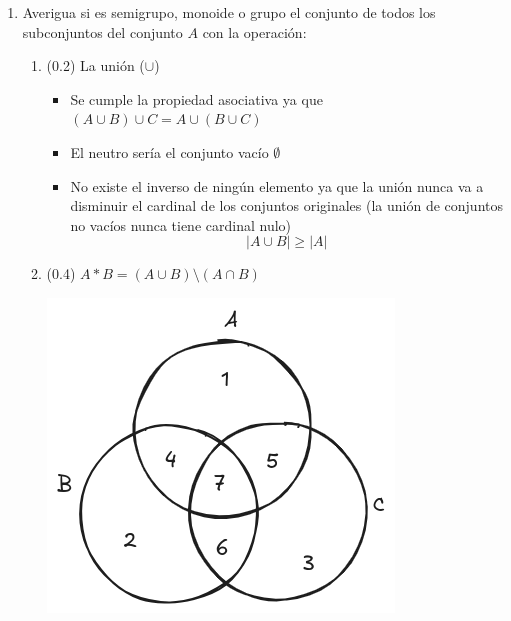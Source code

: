 \documentclass[a4paper,12pt]{article}
\begin{document}
\begin{enumerate}
    \item Averigua si es semigrupo, monoide o grupo el conjunto de todos los subconjuntos del conjunto $A$ con la operación:

    \begin{enumerate}
        \item (0.2) La unión ($\cup$)

        \begin{itemize}
            \item Se cumple la propiedad asociativa ya que $(A\cup B)\cup C = A \cup (B \cup C)$
            \item El neutro sería el conjunto vacío $\emptyset$
            \item No existe el inverso de ningún elemento ya que la unión nunca va a disminuir el cardinal de los conjuntos originales (la unión de conjuntos no vacíos nunca tiene cardinal nulo)
                $$|A\cup B| \ge |A|$$
        \end{itemize}

        \item (0.4) $A*B = (A \cup B) \setminus (A \cap B)$

        \includegraphics[scale=0.4]{./diagramas.png} 


\end{enumerate}
\end{enumerate}
\end{document}
